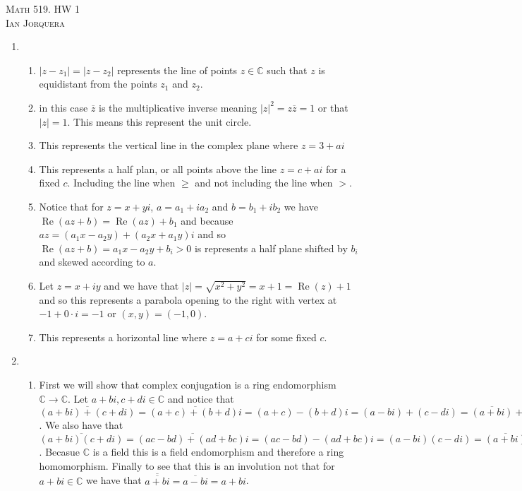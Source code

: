 \documentclass[12pt]{amsart}
\theoremstyle{definition}
\newcommand{\C}{\mathbb{C}}
\DeclareMathOperator{\Real}{\mathrm{Re}}
\newcommand{\ra}{\rightarrow}
\begin{document}
\begin{center}
    \textsc{Math 519. HW 1\\ Ian Jorquera}
\end{center}
\vspace{1em}

\begin{enumerate}

\item 
\begin{enumerate}[label=(\alph*)]
    \item $|z-z_1|=|z-z_2|$ represents the line of points $z\in \C$ such that $z$ is equidistant from the points $z_1$ and $z_2$.
    \item in this case $\overline{z}$ is the multiplicative inverse meaning $|z|^2=z\overline{z}=1$ or that $|z|=1$. This means this represent the unit circle.
    \item This represents the vertical line in the complex plane where $z=3+ai$ 
    \item This represents a half plan, or all points above the line $z=c+ai$ for a fixed $c$. Including the line when $\geq$ and not including the line when $>$.
    \item Notice that for $z=x+yi$, $a=a_1+ia_2$ and $b=b_1+ib_2$ we have $\Real(az+b)=\Real(az)+b_1$ and because $az=(a_1x- a_2y) + (a_2x+a_1y)i$ and so $\Real(az+b) = a_1x- a_2y + b_i> 0$ is represents a half plane shifted by $b_i$ and skewed according to $a$.
    \item Let $z=x+iy$ and we have that $|z|=\sqrt{x^{2}+y^{2}}=x+1=\Real(z)+1$ and so this represents a parabola opening to the right with vertex at $-1+0\cdot i=-1$ or $(x,y)=(-1,0)$.\\
    \item This represents a horizontal line where $z=a+ci$ for some fixed $c$.\\
\end{enumerate}

\item
\begin{enumerate}[label=(\alph*)]
    \item First we will show that complex conjugation is a ring endomorphism $\C\ra\C$. Let $a+bi,c+di\in \C$ and notice that $\overline{(a+bi)+(c+di)}=\overline{(a+c)+(b+d)i}=(a+c)-(b+d)i=(a-bi)+(c-di)=\overline{(a+bi)}+\overline{(c+di)}$. We also have that $\overline{(a+bi)(c+di)}=\overline{(ac-bd)+(ad+bc)i}=(ac-bd)-(ad+bc)i=(a-bi)(c-di)=\overline{(a+bi)}\cdot\overline{(c+di)}$. Becasue $\C$ is a field this is a field endomorphism and therefore a ring homomorphism. Finally to see that this is an involution not that for $a+bi\in \C$ we have that $\overline{\overline{a+bi}}=\overline{a-bi}=a+bi$.\\


\end{enumerate}
\end{enumerate}
\end{document}
